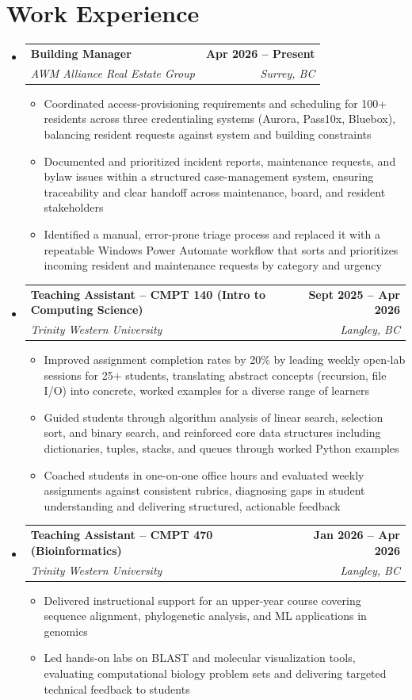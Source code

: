 \documentclass[letterpaper,10pt]{article}
\makeatletter
\newcommand{\resumeItem}[1]{\item\small{#1 \vspace{-2pt}}}
\newcommand{\resumeSubheading}[4]{%
  \vspace{-2pt}\item[]
    \begin{tabular*}{1.0\textwidth}[t]{l@{\extracolsep{\fill}}r}
      \textbf{#1} & \textbf{\small #2} \\
      \textit{\small #3} & \textit{\small #4} \\
    \end{tabular*}\vspace{-4pt}
}
\newcommand{\resumeSubHeadingListStart}{\begin{itemize}[leftmargin=0in, itemsep=0pt]}
\newcommand{\resumeSubHeadingListEnd}{\end{itemize}}
\newcommand{\resumeItemListStart}{\begin{itemize}[leftmargin=0.18in, label=\raisebox{0.2ex}{\scriptsize\textbullet}, itemsep=0pt, topsep=4pt]}
\newcommand{\resumeItemListEnd}{\end{itemize}\vspace{-2pt}}
\makeatother
\begin{document}
\section{Work Experience}
\resumeSubHeadingListStart
\resumeSubheading
  {Building Manager}{Apr 2026 -- Present}
  {AWM Alliance Real Estate Group}{Surrey, BC}
\resumeItemListStart
    \resumeItem{Coordinated access-provisioning requirements and scheduling for 100+ residents across three credentialing systems (Aurora, Pass10x, Bluebox), balancing resident requests against system and building constraints}
    \resumeItem{Documented and prioritized incident reports, maintenance requests, and bylaw issues within a structured case-management system, ensuring traceability and clear handoff across maintenance, board, and resident stakeholders}
    \resumeItem{Identified a manual, error-prone triage process and replaced it with a repeatable Windows Power Automate workflow that sorts and prioritizes incoming resident and maintenance requests by category and urgency}
\resumeItemListEnd
\resumeSubheading
  {Teaching Assistant -- CMPT 140 (Intro to Computing Science)}{Sept 2025 -- Apr 2026}
  {Trinity Western University}{Langley, BC}
\resumeItemListStart
    \resumeItem{Improved assignment completion rates by 20\% by leading weekly open-lab sessions for 25+ students, translating abstract concepts (recursion, file I/O) into concrete, worked examples for a diverse range of learners}
    \resumeItem{Guided students through algorithm analysis of linear search, selection sort, and binary search, and reinforced core data structures including dictionaries, tuples, stacks, and queues through worked Python examples}
    \resumeItem{Coached students in one-on-one office hours and evaluated weekly assignments against consistent rubrics, diagnosing gaps in student understanding and delivering structured, actionable feedback}
\resumeItemListEnd
\resumeSubheading
  {Teaching Assistant -- CMPT 470 (Bioinformatics)}{Jan 2026 -- Apr 2026}
  {Trinity Western University}{Langley, BC}
\resumeItemListStart
    \resumeItem{Delivered instructional support for an upper-year course covering sequence alignment, phylogenetic analysis, and ML applications in genomics}
    \resumeItem{Led hands-on labs on BLAST and molecular visualization tools, evaluating computational biology problem sets and delivering targeted technical feedback to students}
\resumeItemListEnd
\resumeSubHeadingListEnd
\vspace{-9pt}
\end{document}
